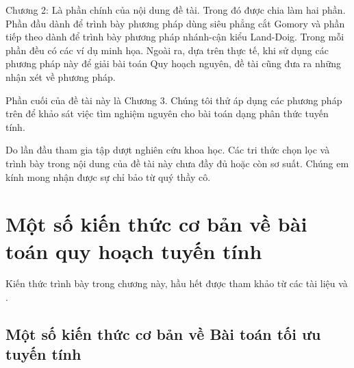 \documentclass[12pt,a4paper]{report}
\begin{document}
Chương 2: Là phần chính của nội dung đề tài. Trong đó được chia làm hai phần. Phần đầu dành để trình bày phương pháp dùng siêu phẳng cắt Gomory và phần tiếp theo dành để trình bày phương pháp nhánh-cận kiểu Land-Doig. Trong mỗi phần đều có các ví dụ minh họa. Ngoài ra, dựa trên thực tế, khi sử dụng các phương pháp này để giải bài toán Quy hoạch nguyên, đề tài cũng đưa ra những nhận xét về phương pháp.

Phần cuối của đề tài này là Chương 3. Chúng tôi thử áp dụng các phương pháp trên để khảo sát việc tìm nghiệm nguyên cho bài toán dạng phân thức tuyến tính. 

Do lần đầu tham gia tập dượt nghiên cứu khoa học. Các tri thức chọn lọc và trình bày trong nội dung của đề tài này chưa đầy đủ hoặc còn sơ suất. Chúng em kính mong nhận được sự chỉ bảo từ quý thầy cô.

\newpage
\renewcommand{\baselinestretch}{1.2}
 
\chapter{Một số kiến thức cơ bản về bài toán quy hoạch tuyến tính} 
Kiến thức trình bày trong chương này, hầu hết được tham khảo từ các tài liệu  \cite{xxx} và \cite{xxx}.

\section{Một số kiến thức cơ bản về Bài toán tối ưu tuyến tính}
\end{document}
